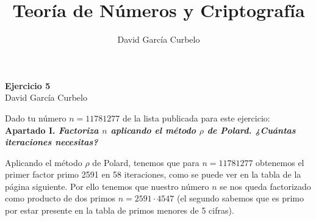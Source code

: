 \documentclass[fleqn]{article}
\author{David García Curbelo}
\title{Teoría de Números y Criptografía}
\begin{document}
    \begin{center}
        \LARGE{\textbf{Ejercicio 5}} \\
        \Large{David García Curbelo} \\
    \end{center}

    \vspace{1cm}
    
    Dado tu número $n = 11781277$ de la lista publicada para este ejercicio: \\ 


    \textbf{Apartado I. \textit{Factoriza $n$ aplicando el método $\rho$ de Polard. ¿Cuántas iteraciones necesitas?}} 
    
    Aplicando el método $\rho$ de Polard, tenemos que para $n = 11781277$ obtenemos el primer factor primo 2591
    en 58 iteraciones, como se puede ver en la tabla de la página siguiente. Por ello tenemos que nuestro número $n$ se
    nos queda factorizado como producto de dos primos $n = 2591 \cdot 4547$ (el segundo sabemos que es primo por estar 
    presente en la tabla de primos menores de 5 cifras).
\end{document}
